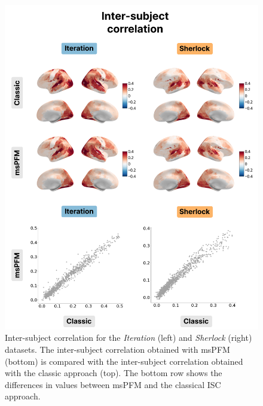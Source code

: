 \begin{figure}[!ht]
\centering
\includegraphics[width=0.7\linewidth]{figures/multi_subject/inter_subject.png}
\caption[]{Inter-subject correlation for the \textit{Iteration} (left) and
\textit{Sherlock} (right) datasets. The inter-subject correlation obtained with
msPFM (bottom) is compared with the inter-subject correlation obtained with the
classic approach (top). The bottom row shows the differences in values between
msPFM and the classical ISC approach.}
\label{fig:isc}
\end{figure}

